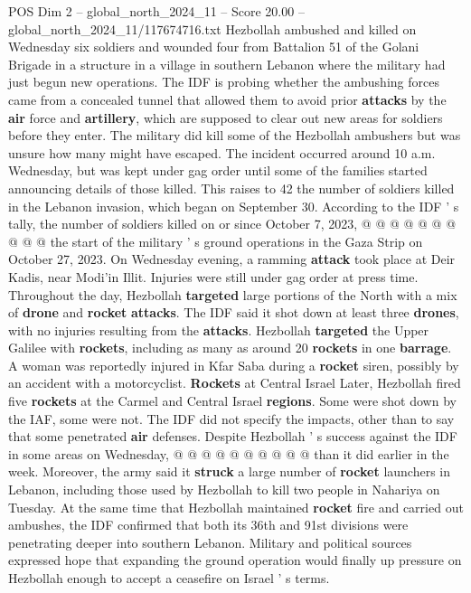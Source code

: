 \begin{textsample}{POS Dim 2 – global\_north\_2024\_11 – Score 20.00 – global\_north\_2024\_11/117674716.txt}
Hezbollah ambushed and killed on Wednesday six soldiers and wounded four from Battalion 51 of the Golani Brigade in a structure in a village in southern Lebanon where the military had just begun new operations.
The IDF is probing whether the ambushing forces came from a concealed tunnel that allowed them to avoid prior \textbf{attacks} by the \textbf{air} force and \textbf{artillery}, which are supposed to clear out new areas for soldiers before they enter.
The military did kill some of the Hezbollah ambushers but was unsure how many might have escaped.
The incident occurred around 10 a.m.
Wednesday, but was kept under gag order until some of the families started announcing details of those killed.
This raises to 42 the number of soldiers killed in the Lebanon invasion, which began on September 30.
According to the IDF ' s tally, the number of soldiers killed on or since October 7, 2023, @ @ @ @ @ @ @ @ @ @ the start of the military ' s ground operations in the Gaza Strip on October 27, 2023.
On Wednesday evening, a ramming \textbf{attack} took place at Deir Kadis, near Modi'in Illit.
Injuries were still under gag order at press time.
Throughout the day, Hezbollah \textbf{targeted} large portions of the North with a mix of \textbf{drone} and \textbf{rocket} \textbf{attacks}.
The IDF said it shot down at least three \textbf{drones}, with no injuries resulting from the \textbf{attacks}.
Hezbollah \textbf{targeted} the Upper Galilee with \textbf{rockets}, including as many as around 20 \textbf{rockets} in one \textbf{barrage}.
A woman was reportedly injured in Kfar Saba during a \textbf{rocket} siren, possibly by an accident with a motorcyclist. \textbf{Rockets} at Central Israel Later, Hezbollah fired five \textbf{rockets} at the Carmel and Central Israel \textbf{regions}.
Some were shot down by the IAF, some were not.
The IDF did not specify the impacts, other than to say that some penetrated \textbf{air} defenses.
Despite Hezbollah ' s success against the IDF in some areas on Wednesday, @ @ @ @ @ @ @ @ @ @ than it did earlier in the week.
Moreover, the army said it \textbf{struck} a large number of \textbf{rocket} launchers in Lebanon, including those used by Hezbollah to kill two people in Nahariya on Tuesday.
At the same time that Hezbollah maintained \textbf{rocket} fire and carried out ambushes, the IDF confirmed that both its 36th and 91st divisions were penetrating deeper into southern Lebanon.
Military and political sources expressed hope that expanding the ground operation would finally up pressure on Hezbollah enough to accept a ceasefire on Israel ' s terms.

\end{textsample}
